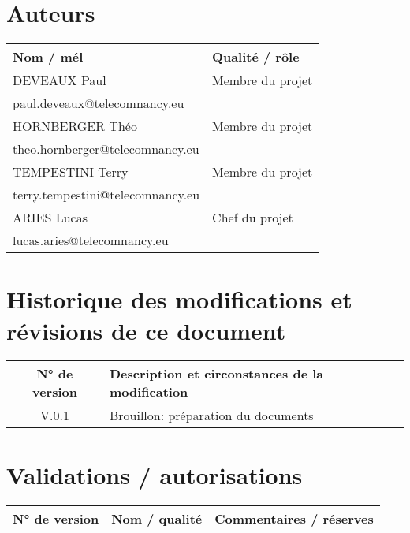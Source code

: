 \documentclass{report}
\begin{document}
\begin{center}
    \textbf{\color{orange}{\Huge Projet PPII - Charte}}
\end{center}
\vspace{0.7cm}
\section*{\color{orange}Auteurs}
\begin{tabular}{l|p{8cm}}
   \textbf{Nom / mél} & \textbf{Qualité / rôle}  \\
   \hline 
    DEVEAUX Paul & Membre du projet  \\
    paul.deveaux@telecomnancy.eu & \\ \hline
    HORNBERGER Théo & Membre du projet \\
    theo.hornberger@telecomnancy.eu & \\ \hline
    TEMPESTINI Terry & Membre du projet \\
    terry.tempestini@telecomnancy.eu & \\ \hline
    ARIES Lucas & Chef du projet \\
    lucas.aries@telecomnancy.eu & \\ \hline
\end{tabular}

\vspace{0.5cm}

\section*{\color{orange}Historique des modifications et révisions de ce document}
\begin{tabular}{c|p{10cm}}
   \textbf{N° de version} & \textbf{Description et circonstances de la modification}  \\
   \hline 
    V.0.1 & Brouillon: préparation du documents
    \\ \hline
\end{tabular}

\vspace{0.5cm}

\section*{\color{orange}Validations / autorisations}
\begin{tabular}{c|p{4cm}|p{6cm}}
   \textbf{N° de version} & \textbf{Nom / qualité} & \textbf{Commentaires / réserves}
    \\ \hline
\end{tabular}
\end{document}
